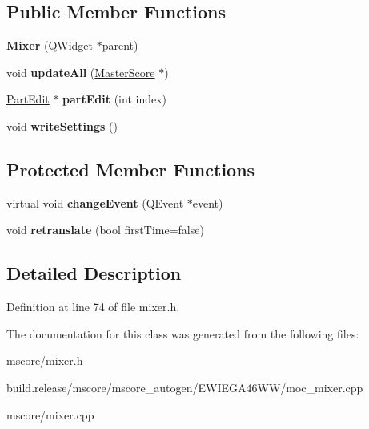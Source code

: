 \subsection*{Public Member Functions}
\begin{DoxyCompactItemize}
\item 
\mbox{\label{class_ms_1_1_mixer_ab353ec74d259b15de0fd1b164e7bb16c}} 
{\bfseries Mixer} (Q\+Widget $\ast$parent)
\item 
\mbox{\label{class_ms_1_1_mixer_aa1b5bf03951a395fc16acb9d9b915fe1}} 
void {\bfseries update\+All} (\hyperlink{class_ms_1_1_master_score}{Master\+Score} $\ast$)
\item 
\mbox{\label{class_ms_1_1_mixer_a46c5ed4bbb0a645b05773db386c563fd}} 
\hyperlink{class_ms_1_1_part_edit}{Part\+Edit} $\ast$ {\bfseries part\+Edit} (int index)
\item 
\mbox{\label{class_ms_1_1_mixer_ac6a41f9627ae6c7bcefda5fee21a4eac}} 
void {\bfseries write\+Settings} ()
\end{DoxyCompactItemize}
\subsection*{Protected Member Functions}
\begin{DoxyCompactItemize}
\item 
\mbox{\label{class_ms_1_1_mixer_a22e90ff86f071907719d945397e32213}} 
virtual void {\bfseries change\+Event} (Q\+Event $\ast$event)
\item 
\mbox{\label{class_ms_1_1_mixer_aa565f3ecdf27a59b4374b42e7635f550}} 
void {\bfseries retranslate} (bool first\+Time=false)
\end{DoxyCompactItemize}


\subsection{Detailed Description}


Definition at line 74 of file mixer.\+h.



The documentation for this class was generated from the following files\+:\begin{DoxyCompactItemize}
\item 
mscore/mixer.\+h\item 
build.\+release/mscore/mscore\+\_\+autogen/\+E\+W\+I\+E\+G\+A46\+W\+W/moc\+\_\+mixer.\+cpp\item 
mscore/mixer.\+cpp\end{DoxyCompactItemize}
